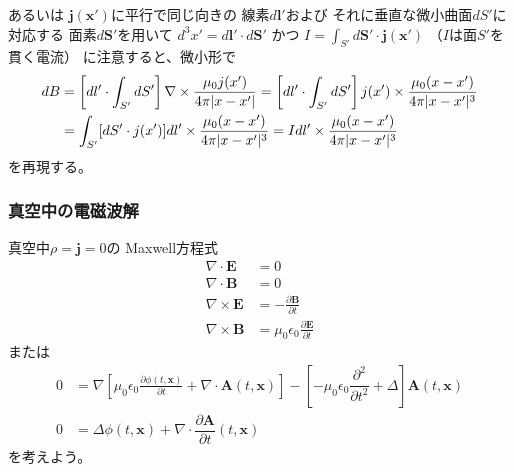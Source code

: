 あるいは
$\bm{j}(\bm{x}')$に平行で同じ向きの
線素$d \bm{l}'$および
それに垂直な微小曲面$dS'$に対応する
面素$d \bm{S}'$を用いて
$d^3 x' = d \bm{l}' \cdot d \bm{S}'$
かつ
$I = \int_{S'} d \bm{S}' \cdot \bm{j}(\bm{x}')$
（$I$は面$S'$を貫く電流）
に注意すると、微小形で
\begin{align}
  d B
&=
  \left[
    d l' \cdot
    \int_{S'} d S'
  \right]
  \nabla \times
    \dfrac{
      \mu_0 j (x')
    }{
      4 \pi
      |x - x'|
    }
=
  \left[
    d l' \cdot
    \int_{S'} d S'
  \right]
  j (x') \times
    \dfrac{
      \mu_0
      (x - x')
    }{
      4 \pi
      |x - x'|^3
    }
\notag\\&
=
  \int_{S'}
    [d S' \cdot j (x')]
  d l' \times
    \dfrac{
      \mu_0
      (x - x')
    }{
      4 \pi
      |x - x'|^3
    }
=
  I d l'
  \times
    \dfrac{
      \mu_0
      (x - x')
    }{
      4 \pi
      |x - x'|^3
    }
\end{align}
を再現する。

\subsubsection{真空中の電磁波解}

真空中$\rho = \bm{j} = 0$の
Maxwell方程式
\begin{subequations}
\begin{align}
  \nabla \cdot \bm{E}
&=
  0
\\
  \nabla \cdot \bm{B}
&= 0
\\
  \nabla \times \bm{E}
&=
  - \frac{\partial \bm{B}}
    {\partial t}
\\
  \nabla \times \bm{B}
&=
  \mu_0 \epsilon_0
    \frac{\partial \bm{E}}
      {\partial t}
\end{align}
\end{subequations}
または
\begin{subequations}
\begin{align}
  0
&=
  \nabla
  \left[
    \mu_0 \epsilon_0
    \frac{\partial \phi (t, \bm{x})}
      {\partial t}
  +
    \nabla \cdot
      \bm{A} (t, \bm{x})
  \right]
  -
  \left[
    - \mu_0 \epsilon_0
    \dfrac{\partial^2}{\partial t^2}
  +
    \Delta
  \right]
    \bm{A} (t, \bm{x})
\\
  0
&=
    \Delta \phi (t, \bm{x})
  +
    \nabla \cdot
    \dfrac{\partial \bm{A}}
      {\partial t} (t, \bm{x})
\end{align}
\end{subequations}
を考えよう。

